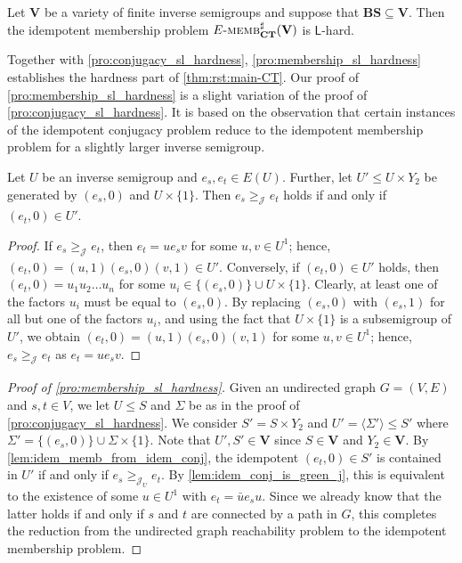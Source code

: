 \documentclass[anonymous,letter,UKenglish,cleveref,autoref,thm-restate]{lipics-v2021}
\renewcommand{\geq}{\geqslant}
\renewcommand{\leq}{\leqslant}
\newcommand{\sse}{\subseteq}
\newcommand{\LOGSPACE}{\ensuremath{\mathsf{L}}\xspace}
\newcommand{\vV}{\ensuremath{\mathbf{V}}}
\newcommand{\vBS}{\ensuremath{\mathbf{BS}}}  \newcommand{\vBM}{\ensuremath{\mathbf{BM}}}
\newcommand*{\gJge}[1][]{\geq_{\mathcal{J}_{#1}}}
\theoremstyle{plain}
\theoremstyle{plain}
\newcommand{\dMembS}[2][]{\textup{\textsc{memb${}^{\sharp}_{\mathbf{#1}}\expandafter\ifx\expandafter\relax\detokenize{#2}\relax\else(#2)\fi$}}}
\newcommand{\dEMembS}[2][]{\ensuremath{E}\textnormal{-}\dMembS[#1]{#2}}
\begin{document}
\begin{proposition}\label{pro:membership_sl_hardness}
	Let $\vV$ be a variety of finite inverse semigroups and suppose that $\vBS \sse \vV$.
	Then the idempotent membership problem $\dEMembS[CT]{\vV}$ is \LOGSPACE-hard. 
\end{proposition}

Together with \cref{pro:conjugacy_sl_hardness}, \cref{pro:membership_sl_hardness} establishes the hardness part of \cref{thm:rst:main-CT}.
Our proof of \cref{pro:membership_sl_hardness} is a slight variation of the proof of \cref{pro:conjugacy_sl_hardness}.
It is based on the observation that certain instances of the idempotent conjugacy problem reduce to the idempotent membership problem for a slightly larger inverse semigroup.

\begin{lemma}\label{lem:idem_memb_from_idem_conj}
	Let $U$ be an inverse semigroup and $e_s,e_t \in E(U)$.
	Further, let $U' \leq U \times Y_2$ be generated by $(e_s, 0)$ and $U \times \{1\}$.
	Then $e_s \gJge e_t$ holds if and only if $(e_t, 0) \in U'$.
\end{lemma}
\begin{proof}
	If $e_s \gJge e_t$, then $e_t = u e_s v$ for some $u,v \in U^1$; hence, $(e_t, 0) = (u, 1) (e_s, 0) (v, 1) \in U'$.
	Conversely, if $(e_t, 0) \in U'$ holds, then $(e_t, 0) = u_1u_2 \dotsc u_n$ for some $u_i \in \{(e_s, 0)\} \cup U \times \{1\}$.
	Clearly, at least one of the factors $u_i$ must be equal to $(e_s, 0)$.
	By replacing $(e_s, 0)$ with $(e_s, 1)$ for all but one of the factors $u_i$, and using the fact that $U \times \{1\}$ is a subsemigroup of $U'$, we obtain $(e_t, 0) = (u, 1) (e_s, 0) (v, 1)$ for some $u,v \in U^1$; hence, $e_s \gJge e_t$ as $e_t = u e_s v$.
\end{proof}


\begin{proof}[Proof of {\cref{pro:membership_sl_hardness}}]
	Given an undirected graph $G = (V,E)$ and $s,t \in V$, we let $U \leq S$ and $\Sigma$ be as in the proof of \cref{pro:conjugacy_sl_hardness}.
	We consider $S' = S \times Y_2$ and $U' = \langle \Sigma' \rangle \leq S'$ where $\Sigma' = \{ (e_s, 0) \} \cup \Sigma\times\{1\}$.
	Note that $U',S' \in \vV$ since $S \in \vV$ and $Y_2 \in \vV$.
	By \cref{lem:idem_memb_from_idem_conj}, the idempotent $(e_t, 0) \in S'$ is contained in $U'$ if and only if $e_s \gJge[U] e_t$.
	By \cref{lem:idem_conj_is_green_j}, this is equivalent to the existence of some $u \in U^1$ with $e_t = \bar u e_s u$.
	Since we already know that the latter holds if and only if $s$ and $t$ are connected by a path in $G$, this completes the reduction from the undirected graph reachability problem to the idempotent membership problem.
\end{proof}
\end{document}
